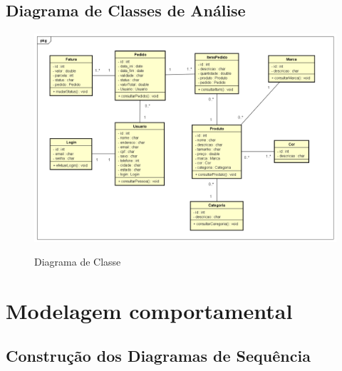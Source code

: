 \subsection{Diagrama de Classes de Análise}
\label{sec:diacla}
\begin{figure}[H]
    \centering
    \caption{Diagrama de Classe}
    \includegraphics[width=1.0\textwidth]{./dados/figuras/5}
    \label{fig:figura-1}
\end{figure}
\section{Modelagem comportamental}
\label{sec:modcom}

\subsection{Construção dos Diagramas de Sequência}
\label{sec:conseq}

